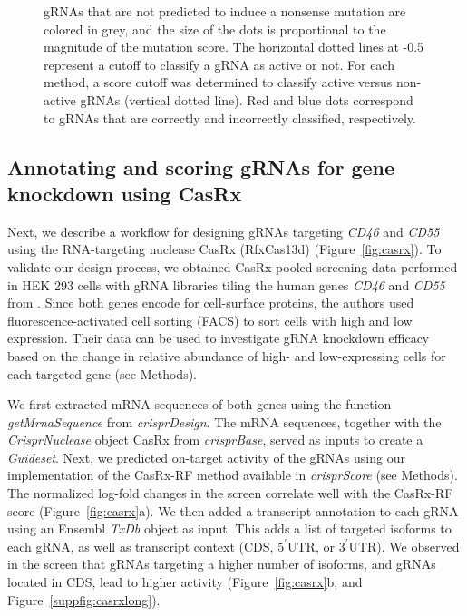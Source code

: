 \documentclass[pdftex,english,10pt]{article}
\begin{document}
\begin{figure}
{ gRNAs that are not predicted to induce a nonsense mutation are colored in grey, and the size of the dots is proportional to the magnitude of the mutation score. The horizontal dotted lines at -0.5 represent a cutoff to classify a gRNA as active or not. For each method, a score cutoff was determined to classify active versus non-active gRNAs (vertical dotted line). Red and blue dots correspond to gRNAs that are correctly and incorrectly classified, respectively. }
  \label{fig:crisprbe}
\end{figure}



\subsection{Annotating and scoring gRNAs for gene knockdown using CasRx}

Next, we describe a workflow for designing gRNAs targeting \textit{CD46} and \textit{CD55} using the RNA-targeting nuclease CasRx (RfxCas13d) \citep{cas13d} (Figure~\ref{fig:casrx}).
To validate our design process, we obtained CasRx pooled screening data performed in HEK 293 cells with gRNA libraries tiling the human genes \textit{CD46} and \textit{CD55} from \citet{wessels2020massively}. Since both genes encode for cell-surface proteins, the authors used fluorescence-activated cell sorting (FACS) to sort cells with high and low expression. Their data can be used to investigate gRNA knockdown efficacy based on the change in relative abundance of high- and low-expressing cells for each targeted gene (see Methods). 

We first extracted mRNA sequences of both genes using the function \textit{getMrnaSequence} from \textit{crisprDesign}. 
The mRNA sequences, together with the \textit{CrisprNuclease} object CasRx from \textit{crisprBase}, served as inputs to create a \textit{Guideset}.
Next, we predicted on-target activity of the gRNAs using our implementation of the CasRx-RF method \citep{wessels2020massively} available in \textit{crisprScore} (see Methods). The normalized log-fold changes in the screen correlate well with the CasRx-RF score (Figure~\ref{fig:casrx}a). We then added a transcript annotation to each gRNA using an Ensembl \textit{TxDb} object as input. This adds a list of targeted isoforms to each gRNA, as well as transcript context (CDS, $5^{\prime}$UTR, or $3^{\prime}$UTR). We observed in the screen that gRNAs targeting a higher number of isoforms, and gRNAs located in CDS, lead to higher activity (Figure~\ref{fig:casrx}b, and Figure~\ref{suppfig:casrxlong}). 
\end{document}
